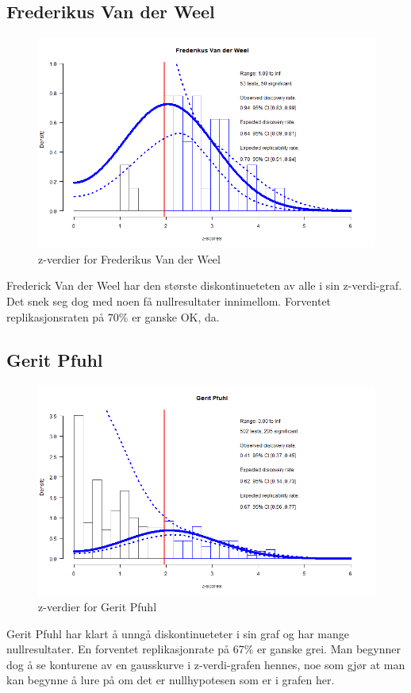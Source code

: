 \documentclass[doc,norsk]{apa7}
\begin{document}
\subsection{Frederikus Van der Weel}
\begin{figure}[h!]
    \centering
    \includegraphics[width=\textwidth]{images/Frederikus Van der Weel.png}
    \caption{z-verdier for Frederikus Van der Weel}
\end{figure}
Frederick Van der Weel har den største diskontinueteten av alle i sin z-verdi-graf. Det snek seg dog med noen få nullresultater innimellom. Forventet replikasjonsraten på 70\% er ganske OK, da.

\subsection{Gerit Pfuhl}
\begin{figure}[h!]
    \centering
    \includegraphics[width=\textwidth]{images/Gerit Pfuhl.png}
    \caption{z-verdier for Gerit Pfuhl}
\end{figure}
Gerit Pfuhl har klart å unngå diskontinueteter i sin graf og har mange nullresultater. En forventet replikasjonrate på 67\% er ganske grei. Man begynner dog å se konturene av en gausskurve i z-verdi-grafen hennes, noe som gjør at man kan begynne å lure på om det er nullhypotesen som er i grafen her.
\end{document}
